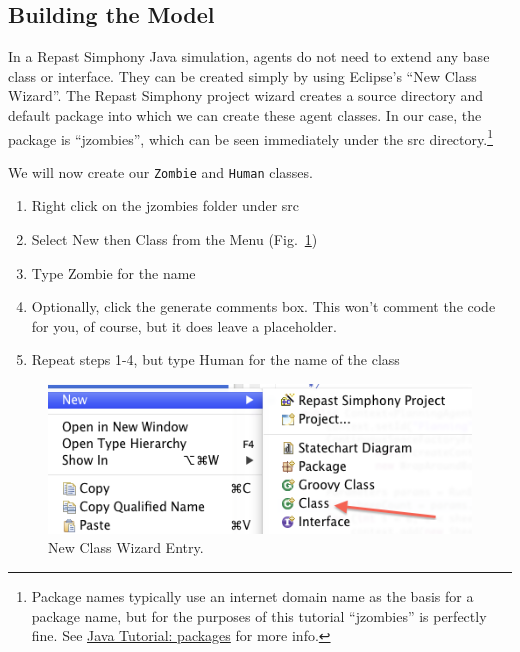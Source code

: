 \documentclass[11pt]{amsart}
\begin{document}
\subsection{Building the Model}
In a Repast Simphony Java simulation, agents do not need to extend any base class or interface. They can be created simply by using Eclipse's ``New Class Wizard''. The Repast Simphony project wizard creates a source directory and default package into which we can create these agent classes. In our case, the package is ``jzombies'', which can be seen immediately under the src directory.\footnote{Package names typically use an internet domain name as the basis for a package name, but for the purposes of this tutorial ``jzombies'' is perfectly fine. See  \href{http://download.oracle.com/javase/tutorial/java/package/namingpkgs.html}{Java Tutorial: packages} for more info.} 

\vspace{.2in}
We will now create our \texttt{Zombie} and \texttt{Human} classes.
\begin{enumerate}
\item Right click on the jzombies folder under src
\item  Select New then Class from the Menu (Fig.~\ref{fig:class_wizard})
\item Type Zombie for the name
\item Optionally, click the generate comments box. This won't comment the code for you, of course, but it does
leave a placeholder.
\item Repeat steps 1-4, but type Human for the name of the class
\end{enumerate}

\begin{figure}[h]
\begin{center}
\vspace{.2in}
\centerline {
\includegraphics[width=5in]{GettingStartedImages/class_wizard.png}
}
\caption{New Class Wizard Entry.}
\label{fig:class_wizard}
\end{center}
\end{figure}
\end{document}
